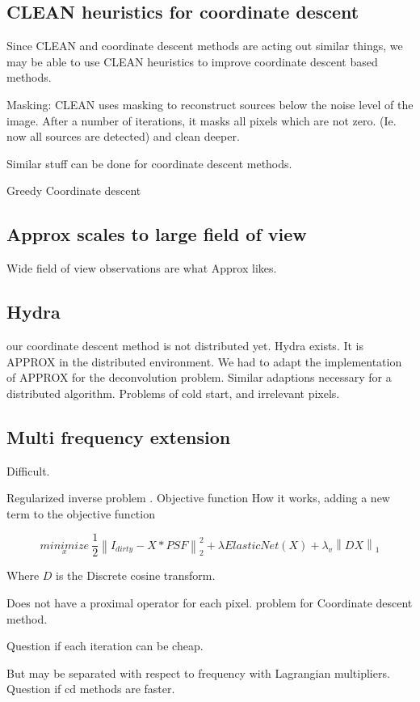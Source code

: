 \subsection{CLEAN heuristics for coordinate descent}
Since CLEAN and coordinate descent methods are acting out similar things, we may be able to use CLEAN heuristics to improve coordinate descent based methods.

Masking: CLEAN uses masking to reconstruct sources below the noise level of the image. After a number of iterations, it masks all pixels which are not zero. (Ie. now all sources are detected) and clean deeper. 

Similar stuff can be done for coordinate descent methods. 

Greedy Coordinate descent

\subsection{Approx scales to large field of view}
Wide field of view observations are what Approx likes.

\subsection{Hydra}
our coordinate descent method is not distributed yet. Hydra exists. It is APPROX in the distributed environment.
We had to adapt the implementation of APPROX for the deconvolution problem. Similar adaptions necessary for a distributed algorithm. Problems of cold start, and irrelevant pixels.





\subsection{Multi frequency extension}\label{discussion:mfs}
Difficult.

Regularized inverse problem  \cite{ferrari2015multi}. Objective function 
How it works, adding a new term to the objective function

\begin{equation}\label{cd:deconv}
\underset{x}{minimize} \: \frac{1}{2} \left \| I_{dirty} - X * PSF \right \|_2^2 + \lambda ElasticNet(X) + \lambda_v \left \| DX \right \|_1
\end{equation}

Where $D$ is the Discrete cosine transform.

Does not have a proximal operator for each pixel. problem for Coordinate descent method.

Question if each iteration can be cheap.

But may be separated with respect to frequency with Lagrangian multipliers. Question if cd methods are faster.
